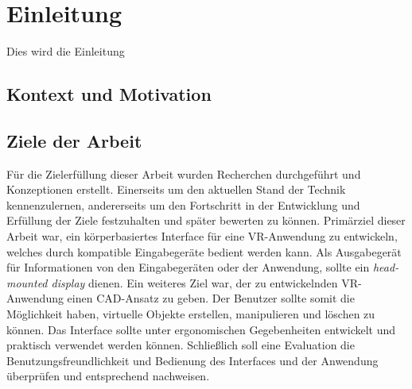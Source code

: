 \section{Einleitung}
Dies wird die Einleitung

\subsection{Kontext und Motivation}

\subsection{Ziele der Arbeit}
Für die Zielerfüllung dieser Arbeit wurden Recherchen durchgeführt und Konzeptionen erstellt. Einerseits um den aktuellen Stand der Technik kennenzulernen, andererseits um den Fortschritt in der Entwicklung und Erfüllung der Ziele festzuhalten und später bewerten zu können.
Primärziel dieser Arbeit war, ein körperbasiertes Interface für eine VR-Anwendung zu entwickeln, welches durch kompatible Eingabegeräte bedient werden kann. Als Ausgabegerät für Informationen von den Eingabegeräten oder der Anwendung, sollte ein \textit{head-mounted display} dienen. Ein weiteres Ziel war, der zu entwickelnden VR-Anwendung einen CAD-Ansatz zu geben. Der Benutzer sollte somit die Möglichkeit haben, virtuelle Objekte erstellen, manipulieren und  löschen zu können. Das Interface sollte unter ergonomischen Gegebenheiten entwickelt und praktisch verwendet werden können. Schließlich soll eine Evaluation die Benutzungsfreundlichkeit und Bedienung des Interfaces und der Anwendung überprüfen und entsprechend nachweisen.